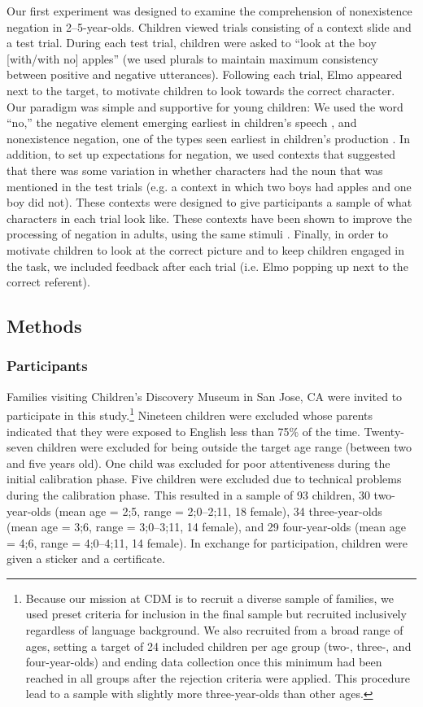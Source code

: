 \documentclass[man]{apa2}
\begin{document}
Our first experiment was designed to examine the comprehension of nonexistence negation in 2--5-year-olds. Children viewed trials consisting of a context slide and a test trial.  During each test trial, children were asked to ``look at the boy [with/with no] apples'' (we used plurals to maintain maximum consistency between positive and negative utterances). Following each trial, Elmo appeared next to the target, to motivate children to look towards the correct character.  Our paradigm was simple  and supportive for young children: We used the word ``no,'' the negative element emerging earliest in children's speech \cite{klima1966, cameron2007}, and nonexistence negation, one of the types seen earliest in children's production \cite{bloom1970, bloom1993, pea1980}. In addition, to set up expectations for negation, we used contexts that suggested that there was some variation in whether characters had the noun that was mentioned in the test trials (e.g. a context in which two boys had apples and one boy did not).  These contexts were designed to give participants a sample of what characters in each trial look like. These contexts have been shown to improve the processing of negation in adults, using the same stimuli \cite{nordmeyer2014}.  Finally, in order to motivate children to look at the correct picture and to keep children engaged in the task, we included feedback after each trial (i.e. Elmo popping up next to the correct referent).  

\subsection{Methods}
\subsubsection{Participants}

Families visiting Children's Discovery Museum in San Jose, CA were invited to participate in this study.\footnote{Because our mission at CDM is to recruit a diverse sample of families, we used preset criteria for inclusion in the final sample but recruited inclusively regardless of language background.  We also recruited from a broad range of ages, setting a target of 24 included children per age group (two-, three-, and four-year-olds) and ending data collection once this minimum had been reached in all groups after the rejection criteria were applied.  This procedure lead to a sample with slightly more three-year-olds than other ages.}  Nineteen children were excluded whose parents indicated that they were exposed to English less than 75\% of the time.  Twenty-seven children were excluded for being outside the target age range (between two and five years old).  One child was excluded for poor attentiveness during the initial calibration phase.  Five children were excluded due to technical problems during the calibration phase.  This resulted in a sample of 93 children, 30 two-year-olds (mean age = 2;5, range = 2;0--2;11, 18 female), 34 three-year-olds (mean age = 3;6, range = 3;0--3;11, 14 female), and 29 four-year-olds (mean age = 4;6, range = 4;0--4;11, 14 female).  In exchange for participation, children were given a sticker and a certificate.  
\end{document}
